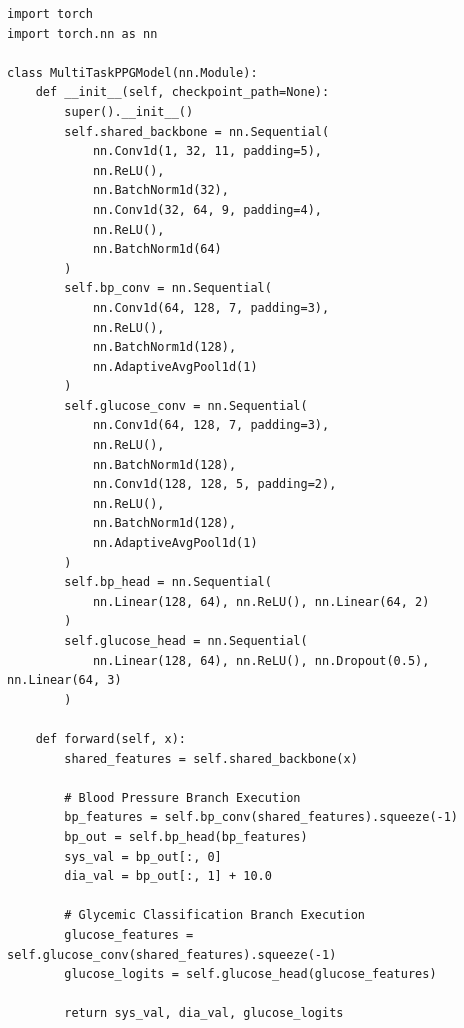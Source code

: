 \vspace{1.5em}
\begin{center}
    \begin{minipage}{\textwidth}
        \centering
        \label{lst:multitask_model}
        \vspace{-0.5em}
    \end{minipage}
\end{center}

\begin{verbatim}
import torch
import torch.nn as nn

class MultiTaskPPGModel(nn.Module):
    def __init__(self, checkpoint_path=None):
        super().__init__()
        self.shared_backbone = nn.Sequential(
            nn.Conv1d(1, 32, 11, padding=5),
            nn.ReLU(),
            nn.BatchNorm1d(32),
            nn.Conv1d(32, 64, 9, padding=4),
            nn.ReLU(),
            nn.BatchNorm1d(64)
        )
        self.bp_conv = nn.Sequential(
            nn.Conv1d(64, 128, 7, padding=3),
            nn.ReLU(),
            nn.BatchNorm1d(128),
            nn.AdaptiveAvgPool1d(1)
        )
        self.glucose_conv = nn.Sequential(
            nn.Conv1d(64, 128, 7, padding=3),
            nn.ReLU(),
            nn.BatchNorm1d(128),
            nn.Conv1d(128, 128, 5, padding=2),
            nn.ReLU(),
            nn.BatchNorm1d(128),
            nn.AdaptiveAvgPool1d(1)
        )
        self.bp_head = nn.Sequential(
            nn.Linear(128, 64), nn.ReLU(), nn.Linear(64, 2)
        )
        self.glucose_head = nn.Sequential(
            nn.Linear(128, 64), nn.ReLU(), nn.Dropout(0.5), nn.Linear(64, 3)
        )

    def forward(self, x):
        shared_features = self.shared_backbone(x)
        
        # Blood Pressure Branch Execution
        bp_features = self.bp_conv(shared_features).squeeze(-1)
        bp_out = self.bp_head(bp_features) 
        sys_val = bp_out[:, 0]
        dia_val = bp_out[:, 1] + 10.0 
        
        # Glycemic Classification Branch Execution
        glucose_features = self.glucose_conv(shared_features).squeeze(-1)
        glucose_logits = self.glucose_head(glucose_features)
        
        return sys_val, dia_val, glucose_logits
\end{verbatim}
\vspace{1.5em}

